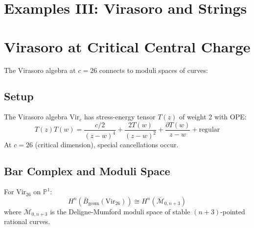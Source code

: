 \section{Examples III: Virasoro and Strings}
 
\section{Virasoro at Critical Central Charge}
 
The Virasoro algebra at $c = 26$ connects to moduli spaces of curves:
 
\subsection{Setup}
 
\begin{definition}
The Virasoro algebra $\text{Vir}_c$ has stress-energy tensor $T(z)$ of weight 2 with OPE:
\[
T(z)T(w) = \frac{c/2}{(z-w)^4} + \frac{2T(w)}{(z-w)^2} + \frac{\partial T(w)}{z-w} + \text{regular}
\]
At $c = 26$ (critical dimension), special cancellations occur.
\end{definition}
 
\subsection{Bar Complex and Moduli Space}
 
\begin{theorem}\label{thm:virasoro-moduli}
For $\text{Vir}_{26}$ on $\mathbb{P}^1$:
\[
H^n(\bar{B}_{\text{geom}}(\text{Vir}_{26})) \cong H^n(\overline{\mathcal{M}}_{0,n+3})
\]
where $\overline{\mathcal{M}}_{0,n+3}$ is the Deligne-Mumford moduli space of stable $(n+3)$-pointed rational curves.
\end{theorem}
 
